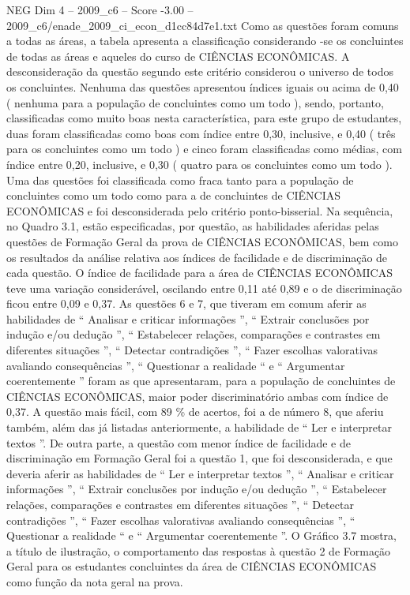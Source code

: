 \begin{textsample}{NEG Dim 4 – 2009\_c6 – Score -3.00 – 2009\_c6/enade\_2009\_ci\_econ\_d1cc84d7e1.txt}
Como as questões foram comuns a todas as áreas, a tabela apresenta a classificação considerando -se os concluintes de todas as áreas e aqueles do curso de CIÊNCIAS ECONÔMICAS.
A desconsideração da questão segundo este critério considerou o universo de todos os concluintes.
Nenhuma das questões apresentou índices iguais ou acima de 0,40 ( nenhuma para a população de concluintes como um todo ), sendo, portanto, classificadas como muito boas nesta característica, para este grupo de estudantes, duas foram classificadas como boas com índice entre 0,30, inclusive, e 0,40 ( três para os concluintes como um todo ) e cinco foram classificadas como médias, com índice entre 0,20, inclusive, e 0,30 ( quatro para os concluintes como um todo ).
Uma das questões foi classificada como fraca tanto para a população de concluintes como um todo como para a de concluintes de CIÊNCIAS ECONÔMICAS e foi desconsiderada pelo critério ponto-bisserial.
Na sequência, no Quadro 3.1, estão especificadas, por questão, as habilidades aferidas pelas questões de Formação Geral da prova de CIÊNCIAS ECONÔMICAS, bem como os resultados da análise relativa aos índices de facilidade e de discriminação de cada questão.
O índice de facilidade para a área de CIÊNCIAS ECONÔMICAS teve uma variação considerável, oscilando entre 0,11 até 0,89 e o de discriminação ficou entre 0,09 e 0,37.
As questões 6 e 7, que tiveram em comum aferir as habilidades de “ Analisar e criticar informações ”, “ Extrair conclusões por indução e/ou dedução ”, “ Estabelecer relações, comparações e contrastes em diferentes situações ”, “ Detectar contradições ”, “ Fazer escolhas valorativas avaliando consequências ”, “ Questionar a realidade “ e “ Argumentar coerentemente ” foram as que apresentaram, para a população de concluintes de CIÊNCIAS ECONÔMICAS, maior poder discriminatório ambas com índice de 0,37.
A questão mais fácil, com 89 \% de acertos, foi a de número 8, que aferiu também, além das já listadas anteriormente, a habilidade de “ Ler e interpretar textos ”.
De outra parte, a questão com menor índice de facilidade e de discriminação em Formação Geral foi a questão 1, que foi desconsiderada, e que deveria aferir as habilidades de “ Ler e interpretar textos ”, “ Analisar e criticar informações ”, “ Extrair conclusões por indução e/ou dedução ”, “ Estabelecer relações, comparações e contrastes em diferentes situações ”, “ Detectar contradições ”, “ Fazer escolhas valorativas avaliando consequências ”, “ Questionar a realidade “ e “ Argumentar coerentemente ”.
O Gráfico 3.7 mostra, a título de ilustração, o comportamento das respostas à questão 2 de Formação Geral para os estudantes concluintes da área de CIÊNCIAS ECONÔMICAS como função da nota geral na prova.

\end{textsample}
